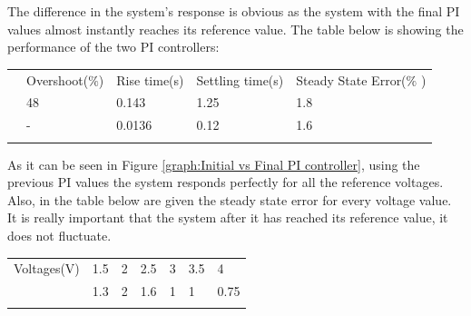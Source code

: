 \documentclass[a4paper]{article}
\begin{document}
The difference in the system's response is obvious as the system with the final PI values almost instantly reaches its reference value.
The table below is showing the performance of the two PI controllers:





\begin{table}[H]
 			\centering
\begin{tabular}{p{0.83in}p{0.99in}p{0.84in}p{0.84in}p{0.84in}}
\hline
\multicolumn{1}{|p{0.83in}}{} & 
\multicolumn{1}{|p{0.99in}}{Overshoot($\%$)} & 
\multicolumn{1}{|p{0.84in}}{Rise time(s)} & 
\multicolumn{1}{|p{0.84in}}{Settling time(s)} & 
\multicolumn{1}{|p{0.84in}|}{Steady State Error($\%$ )} \\
\hhline{-----}
\multicolumn{1}{|p{0.83in}}{Initial} & 
\multicolumn{1}{|p{0.99in}}{48} & 
\multicolumn{1}{|p{0.84in}}{0.143} & 
\multicolumn{1}{|p{0.84in}}{1.25} & 
\multicolumn{1}{|p{0.84in}|}{1.8} \\
\hhline{-----}
\multicolumn{1}{|p{0.83in}}{Final} & 
\multicolumn{1}{|p{0.99in}}{-} & 
\multicolumn{1}{|p{0.84in}}{0.0136} & 
\multicolumn{1}{|p{0.84in}}{0.12} & 
\multicolumn{1}{|p{0.84in}|}{1.6} \\
\hhline{-----}

\end{tabular}
 \end{table}






As it can be seen in Figure \ref{graph:Initial vs Final PI controller}, using the previous PI values the system 
responds perfectly for all the reference voltages. Also, in the table below are 
given the steady state error for every voltage value. It is really important 
that the system after it has reached its reference value, it does not fluctuate. 






\begin{table}[H]
 			\centering
\begin{tabular}{p{0.73in}p{0.68in}p{0.68in}p{0.68in}p{0.68in}p{0.68in}p{0.69in}}
\hline
\multicolumn{1}{|p{0.80in}}{Voltages(V)} & 
\multicolumn{1}{|p{0.68in}}{1.5} & 
\multicolumn{1}{|p{0.68in}}{2} & 
\multicolumn{1}{|p{0.68in}}{2.5} & 
\multicolumn{1}{|p{0.68in}}{3} & 
\multicolumn{1}{|p{0.68in}}{3.5} & 
\multicolumn{1}{|p{0.69in}|}{4} \\
\hhline{-------}
\multicolumn{1}{|p{0.80in}}{Steady State Error} & %
\multicolumn{1}{|p{0.68in}}{1.3} & 
\multicolumn{1}{|p{0.68in}}{2} & 
\multicolumn{1}{|p{0.68in}}{1.6} & 
\multicolumn{1}{|p{0.68in}}{1} & 
\multicolumn{1}{|p{0.68in}}{1} & 
\multicolumn{1}{|p{0.69in}|}{0.75} \\
\hhline{-------}

\end{tabular}
 \end{table}
\end{document}
